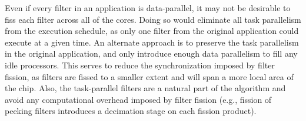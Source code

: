 

Even if every filter in an application is data-parallel, it may not be
desirable to fiss each filter across all of the cores.  Doing so would
eliminate all task parallelism from the execution schedule, as only
one filter from the original application could execute at a given
time.  An alternate approach is to preserve the task parallelism in
the original application, and only introduce enough data parallelism
to fill any idle processors.  This serves to reduce the
synchronization imposed by filter fission, as filters are fissed to a
smaller extent and will span a more local area of the chip.  Also, the
task-parallel filters are a natural part of the algorithm and avoid
any computational overhead imposed by filter fission (e.g., fission of
peeking filters introduces a decimation stage on each fission
product).


